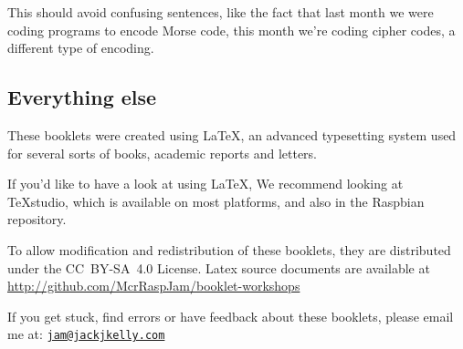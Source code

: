 		\ifprint\else This should avoid confusing sentences, like the fact that last month we were coding programs to encode Morse code, this month we're coding cipher codes, a different type of encoding. \fi
	
	\subsection*{Everything else}
	
		\ifprint\else
			These booklets were created using \textrm{\LaTeX}, an advanced typesetting system used for several sorts of books, academic reports and letters.
			
			If you'd like to have a look at using LaTeX, We recommend looking at \TeX studio, which is available on most platforms, and also in the Raspbian repository.
		\fi
		
		To allow modification and redistribution of these booklets, they are distributed under the \hbox{CC BY-SA 4.0} License.
		Latex source documents are available at \url{http://github.com/McrRaspJam/booklet-workshops}
		
		If you get stuck, find errors or have feedback about these booklets, please email me at:
		\href{mailto:jam@jackjkelly.com}{\texttt{jam@jackjkelly.com}}